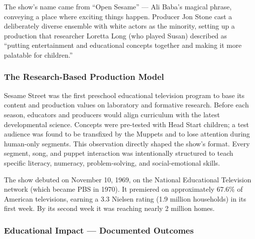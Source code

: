 \documentclass[11pt,letterpaper]{article}
\begin{document}
The show's name came from ``Open Sesame'' --- Ali Baba's magical phrase, conveying a place where exciting things happen. Producer Jon Stone cast a deliberately diverse ensemble with white actors as the minority, setting up a production that researcher Loretta Long (who played Susan) described as ``putting entertainment and educational concepts together and making it more palatable for children.''

\subsubsection{The Research-Based Production Model}

Sesame Street was the first preschool educational television program to base its content and production values on laboratory and formative research. Before each season, educators and producers would align curriculum with the latest developmental science. Concepts were pre-tested with Head Start children; a test audience was found to be transfixed by the Muppets and to lose attention during human-only segments. This observation directly shaped the show's format. Every segment, song, and puppet interaction was intentionally structured to teach specific literacy, numeracy, problem-solving, and social-emotional skills.

The show debuted on November 10, 1969, on the National Educational Television network (which became PBS in 1970). It premiered on approximately 67.6\% of American televisions, earning a 3.3 Nielsen rating (1.9 million households) in its first week. By its second week it was reaching nearly 2 million homes.

\subsubsection{Educational Impact --- Documented Outcomes}
\end{document}
